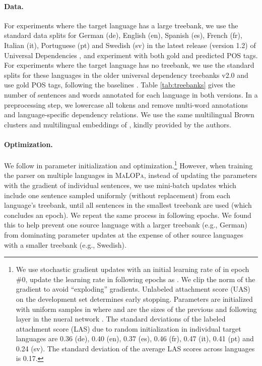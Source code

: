 \documentclass[11pt]{article}
\newcommand{\malopa}{\textsc{MaLOPa}}
\begin{document}
\paragraph{Data.} For experiments where the target language has a large treebank, we use the standard data splits for German (de), English (en), Spanish (es), French (fr), Italian (it), Portuguese (pt) and Swedish (sv) in the latest release (version 1.2) of Universal Dependencies \cite{universal:v1_2}, and experiment with both gold and predicted POS tags.
For experiments where the target language has no treebank, we use the standard splits for these languages in the older universal dependency treebanks v2.0 \cite{mcdonald:13} and use gold POS tags, following the baselines \cite{zhang:15,guo:16}.
Table \ref{tab:treebanks} gives the number of sentences and words annotated for each language in both versions.
In a preprocessing step, we lowercase all tokens and remove multi-word annotations and language-specific dependency relations.
We use the same multilingual Brown clusters and multilingual embeddings of , kindly provided by the authors.

\paragraph{Optimization.} We follow  in parameter initialization and optimization.\footnote{We use stochastic gradient updates with an initial learning rate of  in epoch \#0, update the learning rate in following epochs as . We clip the  norm of the gradient to avoid ``exploding'' gradients. Unlabeled attachment score (UAS) on the development set determines early stopping. Parameters are initialized with uniform samples in  where  and  are the sizes of the previous and following layer in the nueral network \cite{glorot:10}. The standard deviations of the labeled attachment score (LAS) due to random initialization in individual target languages are 0.36 (de), 0.40 (en), 0.37 (es), 0.46 (fr), 0.47 (it), 0.41 (pt) and 0.24 (sv). The standard deviation of the average LAS scores across languages is 0.17.}
However, when training the parser on multiple languages in \malopa, instead of updating the parameters with the gradient of individual sentences, we use mini-batch updates which include one sentence sampled uniformly (without replacement) from each language's treebank, until all sentences in the smallest treebank are used (which concludes an epoch). 
We repeat the same process in following epochs.
We found this to help prevent one source language with a larger treebank (e.g., German) from dominating parameter updates at the expense of other source languages with a smaller treebank (e.g., Swedish).
\end{document}
